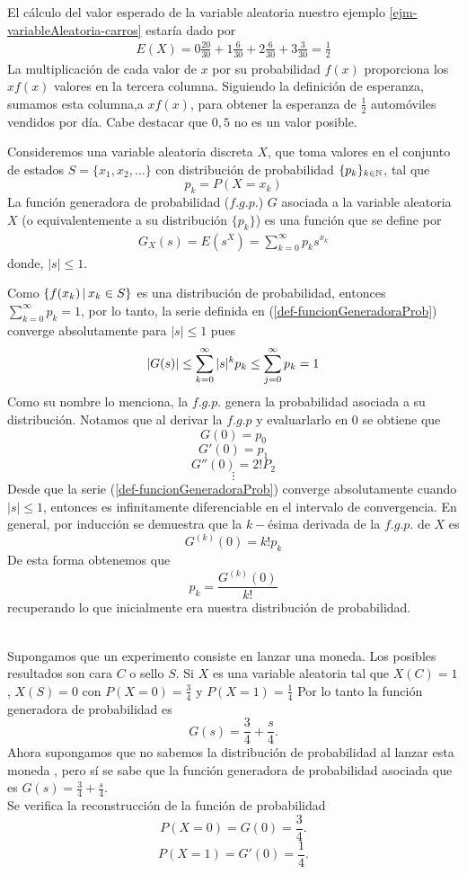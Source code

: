 \begin{Ejm}
    El cálculo del valor esperado de la variable aleatoria nuestro ejemplo \ref{ejm-variableAleatoria-carros} estaría dado por
    \begin{eqnarray}
       E(X)= 0\frac{20}{30}+1\frac{6}{30}+2\frac{6}{30}+3\frac{3}{30}=\frac{1}{2}
    \end{eqnarray}
    La multiplicación de cada valor de $x$ por su probabilidad $f(x)$ proporciona los $xf(x)$ valores en la tercera columna. Siguiendo la definición de esperanza, sumamos esta columna,a $x f(x)$, para obtener la esperanza de $\frac{1}{2}$ automóviles vendidos por día. Cabe destacar que $0,5$ no es un valor posible.
\end{Ejm}
\begin{Def}
    \label{def-prob-funcionGeneraProb}
    Consideremos una variable aleatoria discreta $X$, que toma valores en el conjunto de estados $S=\{x_1,x_2,\ldots\}$ con distribución de probabilidad $\{p_k\}_{k\in{\mathbb{N}}}$, tal que $$p_k=P(X=x_k)$$ 
    La función generadora de probabilidad ($f.g.p.$) $G$ asociada a la variable aleatoria $X$ (o equivalentemente a su distribución $\{p_k\}$) es una función que se define por 
    \begin{eqnarray}
        G_X(s)=E(s^X)=\sum_{k=0}^\infty p_k s^{x_k} \label{def-funcionGeneradoraProb}
    \end{eqnarray} 
    donde,  $|s|\leq 1$.
\end{Def}
Como $\{f(x_k)\thinspace|\thinspace x_k\in S\}$ es una distribución de probabilidad, entonces\\ $\sum_{k=0}^\infty p_k=1$, por lo tanto, la serie definida en (\ref{def-funcionGeneradoraProb}) converge absolutamente para $|s|\leq 1$ pues $$|G(s)|\leq \sum_{k=0}^\infty|s|^k p_k\leq\sum_{j=0}^{\infty} p_k=1 $$ 
Como su nombre lo menciona, la $f.g.p.$ genera la probabilidad asociada a su distribución.
Notamos que al derivar la $f.g.p$ y evaluarlarlo en $0$ se obtiene que
$$G(0)=p_0$$ $$G'(0)=p_1$$ $$G''(0)=2!P_2$$ $$\vdots$$Desde que la serie (\ref{def-funcionGeneradoraProb}) converge absolutamente cuando $|s|\leq 1$, entonces es infinitamente diferenciable en el intervalo de convergencia. En general, por inducción se demuestra que la $k-$ésima derivada de la $f.g.p.$ de $X$ es $$G^{(k)}(0)=k!p_k$$
De esta forma obtenemos que $$p_k=\frac{G^{(k)}(0)}{k!}$$ recuperando lo que inicialmente era nuestra distribución de probabilidad.\\\\
\begin{Ejm}
    Supongamos que un experimento consiste en lanzar una moneda. Los posibles resultados son cara $C$ o sello $S$. Si $X$ es una variable aleatoria tal que $X(C)=1$, $X(S)=0$ con $P(X=0)=\frac{3}{4}$ y $P(X=1)=\frac{1}{4}$
    Por lo tanto la función generadora de probabilidad es
    $$G(s)=\frac{3}{4}+\frac{s}{4}.$$
    Ahora supongamos que no sabemos la distribución de probabilidad al lanzar esta moneda , pero sí se sabe que la función generadora de probabilidad asociada que es $G(s)=\frac{3}{4}+\frac{s}{4}.$\\
    Se verifica la reconstrucción de la función de probabilidad
    $$P(X=0)=G(0)=\frac{3}{4}.$$    $$P(X=1)=G'(0)=\frac{1}{4}.$$
\end{Ejm}
